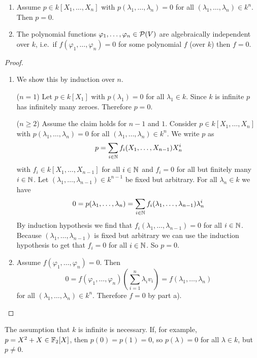 \begin{lem}
 \begin{enumerate}[label=\emph{\alph*)},leftmargin=*]
  \item
   Assume $p \in k[X_1, \dotsc, X_n]$ with $p(\lambda_1, \dotsc, \lambda_n) = 0$ for all $(\lambda_1,\dotsc,\lambda_n) \in k^n$. Then $p = 0$.
  \item
   The polynomial functions $\varphi_1, \dotsc, \varphi_n \in \mathcal{P}(V)$ are algebraically independent over $k$, i.e.\ if $f(\varphi_1, \dotsc, \varphi_n) = 0$ for some polynomial $f$ (over $k$) then $f = 0$.
 \end{enumerate}
\end{lem}
\begin{proof}
 \begin{enumerate}[label=\emph{\alph*)},leftmargin=*]
  \item
   We show this by induction over $n$.
   
   ($n = 1$) Let $p \in k[X_1]$ with $p(\lambda_1) = 0$ for all $\lambda_1 \in k$. Since $k$ is infinite $p$ has infinitely many zeroes. Therefore $p = 0$.
   
   ($n \geq 2$) Assume the claim holds for $n-1$ and $1$. Consider $p \in k[X_1, \dotsc, X_n]$ with $p(\lambda_1, \dotsc, \lambda_n) = 0$ for all $(\lambda_1, \dotsc, \lambda_n) \in k^n$. We write $p$ as
   \[
    p = \sum_{i \in \mathbb{N}} f_i(X_1, \dotsc, X_{n-1}) X_n^i
   \]
   with $f_i \in k[X_1, \dotsc, X_{n-1}]$ for all $i \in \mathbb{N}$ and $f_i = 0$ for all but finitely many $i \in \mathbb{N}$. Let $(\lambda_1, \dotsc, \lambda_{n-1}) \in k^{n-1}$ be fixed but arbitrary. For all $\lambda_n \in k$ we have
   \[
    0 = p(\lambda_1, \dotsc, \lambda_n) = \sum_{i \in \mathbb{N}} f_i(\lambda_1, \dotsc, \lambda_{n-1}) \lambda_n^i
   \]
   By induction hypothesis we find that $f_i(\lambda_1, \dotsc, \lambda_{n-1}) = 0$ for all $i \in \mathbb{N}$. Because $(\lambda_1, \dotsc, \lambda_{n-1})$ is fixed but arbitrary we can use the induction hypothesis to get that $f_i = 0$ for all $i \in \mathbb{N}$. So $p = 0$.
  \item
   Assume $f(\varphi_1, \dotsc, \varphi_n) = 0$. Then
   \[
    0 = f(\varphi_1, \dotsc, \varphi_n)\left(\sum_{i=1}^n \lambda_i v_i\right) = f(\lambda_1, \dotsc, \lambda_n)
   \]
   for all $(\lambda_1, \dotsc, \lambda_n) \in k^n$. Therefore $f = 0$ by part a).
  \qedhere
 \end{enumerate}
\end{proof}

\begin{warn}
 The assumption that $k$ is infinite is necessary. If, for example, $p = X^2+X \in \mathbb{F}_2[X]$, then $p(0) = p(1) = 0$, so $p(\lambda)=0$ for all $\lambda \in k$, but $p \neq 0$.
\end{warn}


